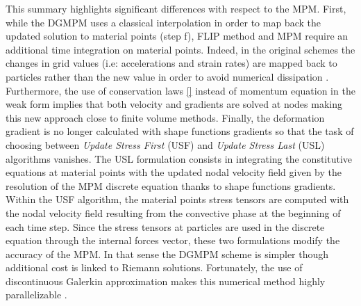 This summary highlights significant differences with respect to the MPM. First, while the DGMPM uses a classical interpolation in order to map back the updated solution to material points (step f), FLIP method and MPM require an additional time integration on material points. Indeed, in the original schemes the changes in grid values (i.e: accelerations and strain rates) are mapped back to particles rather than the new value in order to avoid numerical dissipation \cite{FLIP}. Furthermore, the use of conservation laws \eqref{} instead of momentum equation in the weak form implies that both velocity and gradients are solved at nodes making this new approach close to finite volume methods. Finally, the deformation gradient is no longer calculated with shape functions gradients so that the task of choosing between \textit{Update Stress First} (USF) and \textit{Update Stress Last} (USL) algorithms \cite{USF_USL,Book_MPM} vanishes. The USL formulation consists in integrating the constitutive equations at material points with the updated nodal velocity field given by the resolution of the MPM discrete equation thanks to shape functions gradients. Within the USF algorithm, the material points stress tensors are computed with the nodal velocity field resulting from the convective phase at the beginning of each time step. Since the stress tensors at particles are used in the discrete equation through the internal forces vector, these two formulations modify the accuracy of the MPM. In that sense the DGMPM scheme is simpler though additional cost is linked to Riemann solutions. Fortunately, the use of discontinuous Galerkin approximation makes this numerical method highly parallelizable \cite{Cockburn}.


